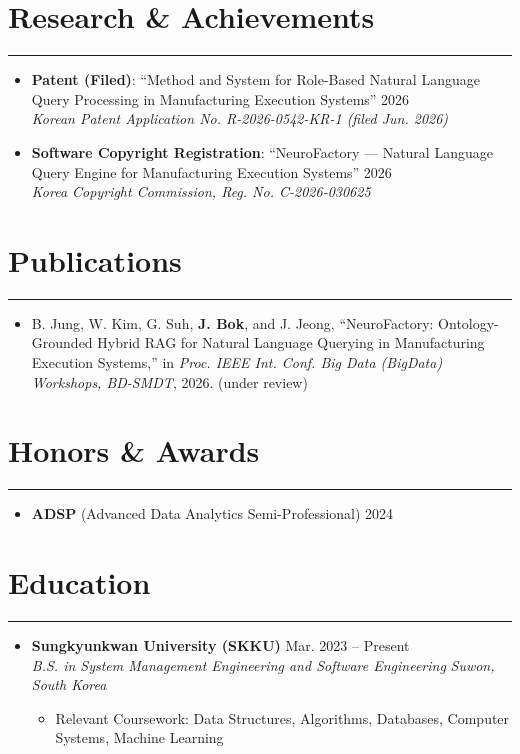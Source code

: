 \documentclass[letterpaper, 10pt]{article}
\begin{document}
\section*{Research \& Achievements}
\hrule
\vspace{1pt}
\begin{itemize}
    \item[] \textbf{Patent (Filed)}: ``Method and System for Role-Based Natural Language Query Processing in Manufacturing Execution Systems'' \hfill 2026 \\
    \textit{Korean Patent Application No. R-2026-0542-KR-1 (filed Jun. 2026)}
    \item[] \textbf{Software Copyright Registration}: ``NeuroFactory --- Natural Language Query Engine for Manufacturing Execution Systems'' \hfill 2026 \\
    \textit{Korea Copyright Commission, Reg. No. C-2026-030625}
\end{itemize}
\section*{Publications}
\hrule
\vspace{1pt}
\begin{itemize}
    \item[] B. Jung, W. Kim, G. Suh, \textbf{J. Bok}, and J. Jeong, ``NeuroFactory: Ontology-Grounded Hybrid RAG for Natural Language Querying in Manufacturing Execution Systems,'' in \textit{Proc. IEEE Int. Conf. Big Data (BigData) Workshops, BD-SMDT}, 2026. (under review)
\end{itemize}
\section*{Honors \& Awards}
\hrule
\vspace{1pt}
\begin{itemize}
    \item[] \textbf{ADSP} (Advanced Data Analytics Semi-Professional) \hfill 2024
\end{itemize}
\section*{Education}
\hrule
\vspace{1pt}
\begin{itemize}
    \item[]
        \textbf{Sungkyunkwan University (SKKU)} \hfill Mar. 2023 -- Present \\
        \textit{B.S. in System Management Engineering and Software Engineering} \hfill \textit{Suwon, South Korea}
        \begin{itemize}
            \item Relevant Coursework: Data Structures, Algorithms, Databases, Computer Systems, Machine Learning
        \end{itemize}
\end{itemize}
\end{document}
